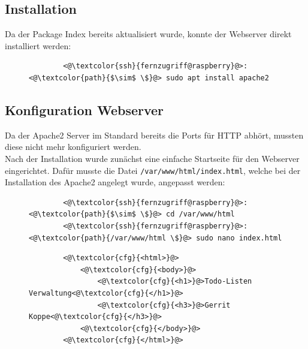 \documentclass[a4paper, 11pt]{scrartcl}
\begin{document}
\subsection{Installation}
Da der Package Index bereits aktualisiert wurde, konnte der Webserver direkt installiert werden:
\begin{figure}[H]
    \begin{mdframed}[backgroundcolor=bbg]
        \begin{lstlisting}
        <@\textcolor{ssh}{fernzugriff@raspberry}@>:<@\textcolor{path}{$\sim$ \$}@> sudo apt install apache2
        \end{lstlisting}
    \end{mdframed}
    \label{lst:apache_install}
\end{figure}


\subsection{Konfiguration Webserver}
Da der Apache2 Server im Standard bereits die Ports für HTTP abhört, mussten diese nicht mehr konfiguriert werden.
\\
Nach der Installation wurde zunächst eine einfache Startseite für den Webserver eingerichtet. Dafür musste die Datei
\lstinline[basicstyle={\small\ttfamily\color{black}}]|/var/www/html/index.html|, welche bei der Installation des Apache2 angelegt wurde, angepasst werden:
\begin{figure}[H]
    \begin{mdframed}[backgroundcolor=bbg]
        \begin{lstlisting}
        <@\textcolor{ssh}{fernzugriff@raspberry}@>:<@\textcolor{path}{$\sim$ \$}@> cd /var/www/html
        <@\textcolor{ssh}{fernzugriff@raspberry}@>:<@\textcolor{path}{/var/www/html \$}@> sudo nano index.html
        \end{lstlisting}
    \end{mdframed}
    \label{lst:index_nano}
\end{figure}
\begin{figure}[H]
    \begin{mdframed}[backgroundcolor=bbg]
        \begin{lstlisting}
        <@\textcolor{cfg}{<html>}@>
            <@\textcolor{cfg}{<body>}@>
                <@\textcolor{cfg}{<h1>}@>Todo-Listen Verwaltung<@\textcolor{cfg}{</h1>}@>
                <@\textcolor{cfg}{<h3>}@>Gerrit Koppe<@\textcolor{cfg}{</h3>}@>
            <@\textcolor{cfg}{</body>}@>
        <@\textcolor{cfg}{</html>}@>
        \end{lstlisting}
    \end{mdframed}
    \label{lst:index_apache2}
\end{figure}
\end{document}

